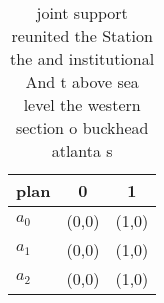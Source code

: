 \documentclass[a4paper]{article}
\begin{document}
\begin{table}
\begin{adjustbox}{width=0.9\columnwidth}
\begin{tabular}{|l|l|l|}
\hline
\textbf{plan} & \multicolumn{1}{c|}{\textbf{0}} & \multicolumn{1}{c|}{\textbf{1}} \\ \hline
\textbf{$a_0$}  & (0,0) & (1,0) \\ \hline
\textbf{$a_1$}  & (0,0) & (1,0) \\ \hline
\textbf{$a_2$}  & (0,0) & (1,0) \\ \hline
\end{tabular}
\end{adjustbox}
\caption{joint support reunited the Station the and institutional And t above sea level the western section o buckhead atlanta s
}
\end{table}
\end{document}
